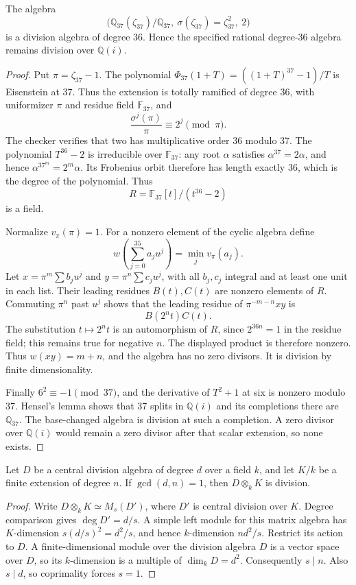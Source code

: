 \begin{lemma}\label{lem:norm36-local37-independent}
The algebra
\[
 \bigl(\mathbb Q_{37}(\zeta_{37})/\mathbb Q_{37},
          \ \sigma(\zeta_{37})=\zeta_{37}^2,\ 2\bigr)
\]
is a division algebra of degree 36.  Hence the specified rational
degree-36 algebra remains division over $\mathbb Q(i)$.
\end{lemma}
\begin{proof}
Put $\pi=\zeta_{37}-1$.  The polynomial
$\Phi_{37}(1+T)=((1+T)^{37}-1)/T$ is Eisenstein at 37.
Thus the extension is totally ramified of degree 36, with
uniformizer $\pi$ and residue field $\mathbb F_{37}$, and
\[
                  \frac{\sigma^j(\pi)}{\pi}\equiv2^j\pmod\pi.
\]
The checker verifies that two has multiplicative order 36 modulo
37.  The polynomial $T^{36}-2$ is irreducible over
$\mathbb F_{37}$: any root $\alpha$ satisfies
$\alpha^{37}=2\alpha$, and hence
$\alpha^{37^m}=2^m\alpha$.  Its Frobenius orbit therefore has
length exactly 36, which is the degree of the polynomial.
Thus
\[
                 R=\mathbb F_{37}[t]/(t^{36}-2)
\]
is a field.

Normalize $v_\pi(\pi)=1$.  For a nonzero element of the cyclic
algebra define
\[
               w\left(\sum_{j=0}^{35}a_ju^j\right)
                       =\min_jv_\pi(a_j).
\]
Let $x=\pi^m\sum b_ju^j$ and $y=\pi^n\sum c_ju^j$, with
all $b_j,c_j$ integral and at least one unit in each list.
Their leading residues $B(t),C(t)$ are nonzero elements of $R$.
Commuting $\pi^n$ past $u^j$ shows that the leading residue of
$\pi^{-m-n}xy$ is
\[
                              B(2^nt)C(t).
\]
The substitution $t\mapsto2^nt$ is an automorphism of $R$,
since $2^{36n}=1$ in the residue field; this remains true for
negative $n$.  The displayed product is therefore nonzero.
Thus $w(xy)=m+n$, and the algebra has no zero divisors.  It is
division by finite dimensionality.

Finally $6^2\equiv-1\pmod{37}$, and the derivative of
$T^2+1$ at six is nonzero modulo 37.  Hensel's lemma shows
that 37 splits in $\mathbb Q(i)$ and its completions there
are $\mathbb Q_{37}$.  The base-changed algebra is division
at such a completion.  A zero divisor over $\mathbb Q(i)$
would remain a zero divisor after that scalar extension, so
none exists.
\end{proof}

\begin{lemma}\label{lem:coprime-division-persistence-independent}
Let $D$ be a central division algebra of degree $d$ over a field
$k$, and let $K/k$ be a finite extension of degree $n$.
If $\gcd(d,n)=1$, then $D\otimes_kK$ is division.
\end{lemma}
\begin{proof}
Write $D\otimes_kK\simeq M_s(D')$, where $D'$ is central
division over $K$.  Degree comparison gives $\deg D'=d/s$.
A simple left module for this matrix algebra has $K$-dimension
$s(d/s)^2=d^2/s$, and hence $k$-dimension $nd^2/s$.
Restrict its action to $D$.  A finite-dimensional module over
the division algebra $D$ is a vector space over $D$, so its
$k$-dimension is a multiple of $\dim_kD=d^2$.
Consequently $s\mid n$.  Also $s\mid d$, so coprimality
forces $s=1$.
\end{proof}

